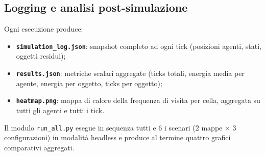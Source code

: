 \subsection{Logging e analisi post-simulazione}

Ogni esecuzione produce:
\begin{itemize}
  \item \textbf{\texttt{simulation\_log.json}}: snapshot completo ad ogni tick (posizioni agenti, stati, oggetti residui);
  \item \textbf{\texttt{results.json}}: metriche scalari aggregate (ticks totali, energia media per agente, energia per oggetto, ticks per oggetto);
  \item \textbf{\texttt{heatmap.png}}: mappa di calore della frequenza di visita per cella, aggregata su tutti gli agenti e tutti i tick.
\end{itemize}

Il modulo \texttt{run\_all.py} esegue in sequenza tutti e 6 i scenari (2 mappe $\times$ 3 configurazioni) in modalità headless e produce al termine quattro grafici comparativi aggregati.
